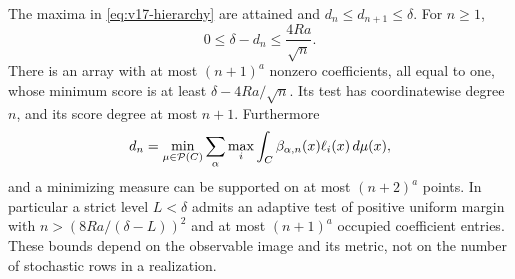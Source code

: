 \begin{theorem}
\label{thm:v17-degree}
The maxima in \eqref{eq:v17-hierarchy} are attained and
$d_n\le d_{n+1}\le\delta$. For $n\ge1$,
\begin{equation}\label{eq:v17-rate}
 0\le\delta-d_n\le \frac{4Ra}{\sqrt n}.
\end{equation}
There is an array with at most $(n+1)^a$ nonzero coefficients, all equal
to one, whose minimum score is at least $\delta-4Ra/\sqrt n$.
Its test has coordinatewise degree $n$, and its score degree at most
$n+1$. Furthermore
\begin{equation}\label{eq:v17-momentdual}
 d_n=\min_{\mu\in\mathcal P(C)}
        \sum_\alpha\max_i\int_C\beta_{\alpha,n}(x)\ell_i(x)\,d\mu(x),
\end{equation}
and a minimizing measure can be supported on at most $(n+2)^a$ points.
In particular a strict level $L<\delta$ admits an adaptive test of
positive uniform margin with
$n>(8Ra/(\delta-L))^2$ and at most $(n+1)^a$ occupied coefficient
entries. These bounds depend on the observable image and its metric,
not on the number of stochastic rows in a realization.
\end{theorem}
